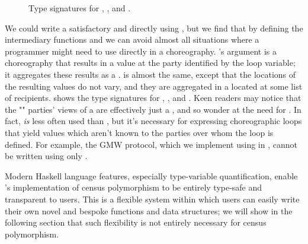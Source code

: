 \begin{figure*}[tbhp]
  \begin{mdframed}
    \inputminted[xleftmargin=10pt,linenos,fontsize=\scriptsize]{haskell}{figures/census-poly-haskell.hs.txt}
    \caption{
        Type signatures for , , and .
    }
    \label{fig:census-poly-haskell}
  \end{mdframed}
\end{figure*}

We could write a satisfactory  and  directly using ,
but we find that by defining the intermediary functions  and 
we can avoid almost all situations where a programmer might need to use  directly in a choreography.
's argument is a choreography that results in a  value at the party identified by the loop variable;
it aggregates these results as a .
 is almost the same, except that the locations of the resulting values do not vary,
and they are aggregated in a  located at some list of recipients.
 shows the type signatures for , , and .
Keen readers may notice that the "" parties' views of a  are effectively just a ,
and so wonder at the need for .
In fact,  \emph{is} less often used than ,
but it's necessary for expressing choreographic loops that yield values which aren't known to the parties over whom the loop is defined.
For example, the GMW protocol, which we implement using \MultiChor in , cannot be written using only .

Modern Haskell language features, especially type-variable quantification,
enable \MultiChor's implementation of census polymorphism to be entirely type-safe and transparent to users.
This is a flexible system within which users can easily write their own novel and bespoke functions and data structures;
we will show in the following section that such flexibility is not entirely necessary for census polymorphism.





